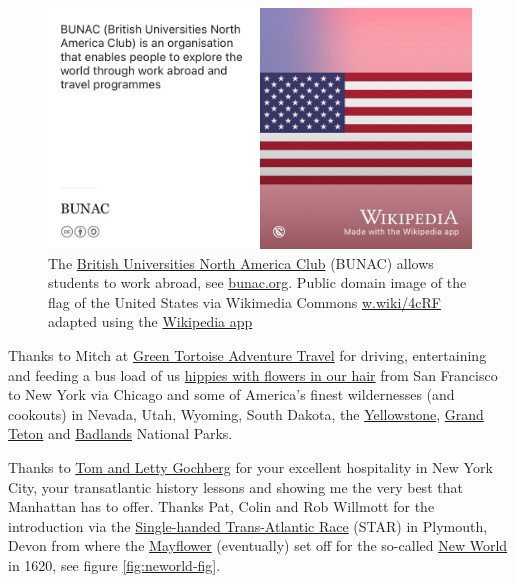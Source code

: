 \documentclass[
]{book}
\begin{document}
\begin{figure}

{\centering \includegraphics[width=0.99\linewidth]{images/BUNAC} 

}

\caption{The \href{https://en.wikipedia.org/wiki/BUNAC}{British Universities North America Club} (BUNAC) allows students to work abroad, see \href{https://bunac.org/}{bunac.org}. Public domain image of the flag of the United States via Wikimedia Commons \href{https://w.wiki/4cRF}{w.wiki/4cRF} adapted using the \href{https://apps.apple.com/us/app/wikipedia/id324715238}{Wikipedia app}}\label{fig:bunac-fig}
\end{figure}



Thanks to Mitch at \href{https://greentortoise.com/}{Green Tortoise Adventure Travel} for driving, entertaining and feeding a bus load of us \href{https://en.wikipedia.org/wiki/San_Francisco_(Be_Sure_to_Wear_Flowers_in_Your_Hair)}{hippies with flowers in our hair} from San Francisco to New York via Chicago and some of America's finest wildernesses (and cookouts) in Nevada, Utah, Wyoming, South Dakota, the \href{https://en.wikipedia.org/wiki/Yellowstone_National_Park}{Yellowstone}, \href{https://en.wikipedia.org/wiki/Grand_Teton_National_Park}{Grand Teton} and \href{https://en.wikipedia.org/wiki/Badlands_National_Park}{Badlands} National Parks. \citep{flowersinyourhair}

Thanks to \href{https://wi.mit.edu/news/memoriam-thomas-gochberg}{Tom and Letty Gochberg} for your excellent hospitality in New York City, your transatlantic history lessons and showing me the very best that Manhattan has to offer. Thanks Pat, Colin and Rob Willmott for the introduction via the \href{https://en.wikipedia.org/wiki/Single-Handed_Trans-Atlantic_Race}{Single-handed Trans-Atlantic Race} (STAR) in Plymouth, Devon from where the \href{https://en.wikipedia.org/wiki/Mayflower}{Mayflower} (eventually) set off for the so-called \href{https://en.wikipedia.org/wiki/New_World}{New World} in 1620, see figure \ref{fig:neworld-fig}.
\end{document}
